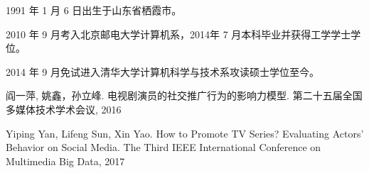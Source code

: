 \begin{resume}


  1991 年 1 月 6 日出生于山东省栖霞市。

  2010 年 9 月考入北京邮电大学计算机系，2014年 7 月本科毕业并获得工学学士学位。

  2014 年 9 月免试进入清华大学计算机科学与技术系攻读硕士学位至今。

  \begin{publications}
  \item 阎一萍, 姚鑫，孙立峰. 电视剧演员的社交推广行为的影响力模型. 第二十五届全国多媒体技术学术会议, 2016
  \item Yiping Yan, Lifeng Sun, Xin Yao. How to Promote TV Series? Evaluating Actors’ Behavior on Social Media. The Third IEEE International Conference on Multimedia Big Data, 2017
  \end{publications}

\end{resume}
